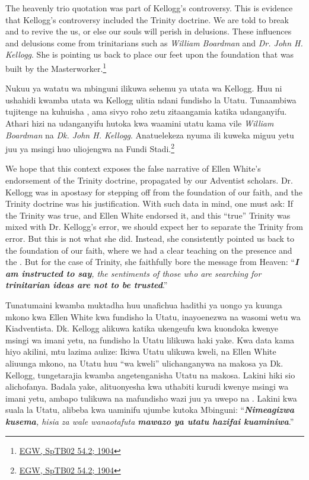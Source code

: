 The heavenly trio quotation was part of Kellogg's controversy. This is evidence that Kellogg’s controversy included the Trinity doctrine. We are told to break  and to revive the  us, or else our souls will perish in delusions. These influences and delusions come from trinitarians such as \textit{William Boardman} and \textit{Dr. John H. Kellogg}. She is pointing us back to place our feet upon the foundation that was built by the Masterworker.\footnote{\href{https://egwwritings.org/?ref=en_SpTB02.54.2&para=417.276}{EGW, SpTB02 54.2; 1904}}


Nukuu ya watatu wa mbinguni ilikuwa sehemu ya utata wa Kellogg. Huu ni ushahidi kwamba utata wa Kellogg ulitia ndani fundisho la Utatu. Tunaambiwa tujitenge  na kuhuisha , ama sivyo roho zetu zitaangamia katika udanganyifu. Athari hizi na udanganyifu hutoka kwa waamini utatu kama vile \textit{William Boardman} na \textit{Dk. John H. Kellogg}. Anatuelekeza nyuma ili kuweka miguu yetu juu ya msingi huo uliojengwa na Fundi Stadi.\footnote{\href{https://egwwritings.org/?ref=en_SpTB02.54.2&para=417.276}{EGW, SpTB02 54.2; 1904}}


We hope that this context exposes the false narrative of Ellen White's endorsement of the Trinity doctrine, propagated by our Adventist scholars. Dr. Kellogg was in apostasy for stepping off from the foundation of our faith, and the Trinity doctrine was his justification. With such data in mind, one must ask: If the Trinity was true, and Ellen White endorsed it, and this “true” Trinity was mixed with Dr. Kellogg's error, we should expect her to separate the Trinity from error. But this is not what she did. Instead, she consistently pointed us back to the foundation of our faith, where we had a clear teaching on the presence and the . But for the case of Trinity, she faithfully bore the message from Heaven: “\textit{\textbf{I am instructed to say}, the sentiments of those who are searching for \textbf{trinitarian ideas are not to be trusted}}.”


Tunatumaini kwamba muktadha huu unafichua hadithi ya uongo ya kuunga mkono kwa Ellen White kwa fundisho la Utatu, inayoenezwa na wasomi wetu wa Kiadventista. Dk. Kellogg alikuwa katika ukengeufu kwa kuondoka kwenye msingi wa imani yetu, na fundisho la Utatu lilikuwa haki yake. Kwa data kama hiyo akilini, mtu lazima aulize: Ikiwa Utatu ulikuwa kweli, na Ellen White aliuunga mkono, na Utatu huu “wa kweli” ulichanganywa na makosa ya Dk. Kellogg, tungetarajia kwamba angetenganisha Utatu na makosa. Lakini hiki sio alichofanya. Badala yake, alituonyesha kwa uthabiti kurudi kwenye msingi wa imani yetu, ambapo tulikuwa na mafundisho wazi juu ya uwepo na . Lakini kwa suala la Utatu, alibeba kwa uaminifu ujumbe kutoka Mbinguni: “\textit{\textbf{Nimeagizwa kusema}, hisia za wale wanaotafuta \textbf{mawazo ya utatu hazifai kuaminiwa}}.”



